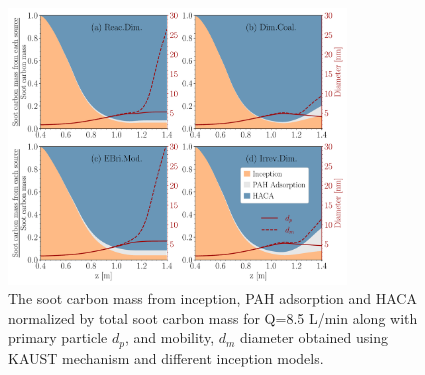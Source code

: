 \begin{figure}[H]
	\centering
	\includegraphics[width=0.8\textwidth]{Figures/Results/PFR/C_tot_distmap.pdf}
	\caption{The soot carbon mass from inception, PAH adsorption and HACA normalized by total soot carbon mass for Q=8.5 L/min along with primary particle $d_p$, and mobility, $d_m$ diameter obtained using KAUST mechanism and different inception models.}
	\label{fig:pfr_cmap} 
\end{figure}